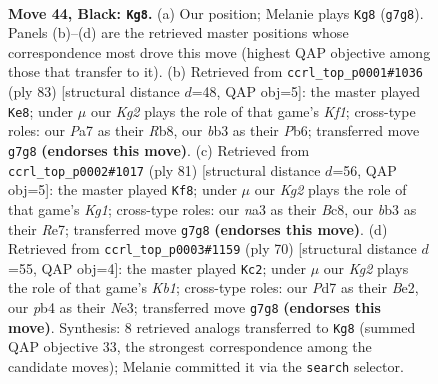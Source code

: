 \documentclass[11pt]{article}
\begin{document}
\clearpage

\begin{figure}[p]\centering
\begin{subfigure}{0.46\textwidth}\centering
\resizebox{\linewidth}{!}{%
\newchessgame
\chessboard[
  setfen={1rb5/p2p2k1/1pp5/5p1p/1PPPnP2/NB6/P6P/2R1K3 b - - 6 44},
  showmover=false,
  pgfstyle=straightmove, color=movearrow, markmove={g7-g8}
]}
\caption{}
\end{subfigure}\hfill
\begin{subfigure}{0.46\textwidth}\centering
\resizebox{\linewidth}{!}{%
\newchessgame
\chessboard[
  setfen={1r3k2/5p2/1p2p1p1/3nP1Pp/P3p3/1P6/3B1PP1/2R2K2 b - - 4 42},
  showmover=false,
  pgfstyle=straightmove, color=movearrow, markmove={f8-e8}
]}
\caption{}
\end{subfigure}
\\[4pt]
\begin{subfigure}{0.46\textwidth}\centering
\resizebox{\linewidth}{!}{%
\newchessgame
\chessboard[
  setfen={2b3k1/2p1r2p/1n1p4/1P1Pppp1/1P6/1B1P1P1P/4N1P1/4R1K1 b - - 0 41},
  showmover=false,
  pgfstyle=straightmove, color=movearrow, markmove={g8-f8}
]}
\caption{}
\end{subfigure}\hfill
\begin{subfigure}{0.46\textwidth}\centering
\resizebox{\linewidth}{!}{%
\newchessgame
\chessboard[
  setfen={4b3/3n1p1p/p2kpp2/Pp6/1P2P2P/4NP2/4B1P1/1K6 w - - 2 36},
  showmover=false,
  pgfstyle=straightmove, color=movearrow, markmove={b1-c2}
]}
\caption{}
\end{subfigure}
\caption{\textbf{Move 44, Black: \texttt{Kg8}.} (a) Our position; Melanie plays \texttt{Kg8} (\texttt{g7g8}). Panels (b)--(d) are the retrieved master positions whose correspondence most drove this move (highest QAP objective among those that transfer to it). (b) Retrieved from \texttt{ccrl\_top\_p0001\#1036} (ply 83) [structural distance $d$=48, QAP obj=5]: the master played \texttt{Ke8}; under $\mu$ our \emph{Kg2} plays the role of that game's \emph{Kf1}; cross-type roles: our \emph{P}a7 as their \emph{R}b8, our \emph{b}b3 as their \emph{P}b6; transferred move \texttt{g7g8} \textbf{(endorses this move)}. (c) Retrieved from \texttt{ccrl\_top\_p0002\#1017} (ply 81) [structural distance $d$=56, QAP obj=5]: the master played \texttt{Kf8}; under $\mu$ our \emph{Kg2} plays the role of that game's \emph{Kg1}; cross-type roles: our \emph{n}a3 as their \emph{B}c8, our \emph{b}b3 as their \emph{R}e7; transferred move \texttt{g7g8} \textbf{(endorses this move)}. (d) Retrieved from \texttt{ccrl\_top\_p0003\#1159} (ply 70) [structural distance $d$=55, QAP obj=4]: the master played \texttt{Kc2}; under $\mu$ our \emph{Kg2} plays the role of that game's \emph{Kb1}; cross-type roles: our \emph{P}d7 as their \emph{B}e2, our \emph{p}b4 as their \emph{N}e3; transferred move \texttt{g7g8} \textbf{(endorses this move)}. Synthesis: 8 retrieved analogs transferred to \texttt{Kg8} (summed QAP objective 33, the strongest correspondence among the candidate moves); Melanie committed it via the \texttt{search} selector.}
\label{fig:thought-m87}
\end{figure}
\end{document}
